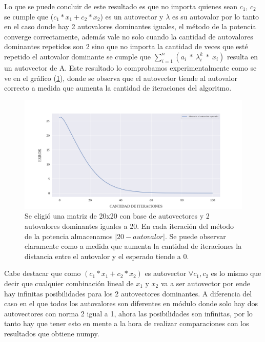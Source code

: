 Lo que se puede concluir de este resultado es que no importa quienes sean $c_1$, $c_2$ se cumple que ($c_1 * x_1 + c_2 * x_2$) es un autovector y $\lambda$ es su autovalor por lo tanto en el caso donde hay 2 autovalores dominantes iguales, el método de la potencia converge correctamente, además vale no solo cuando la cantidad de autovalores dominantes repetidos son 2 sino que no importa la cantidad de veces que esté repetido el autovalor dominante se cumple que $\sum_{i=1}^{n} (a_i \ * \ \lambda_{i}^{k} \ * \ x_i)$ resulta en un autovector de A.
Este resultado lo comprobamos experimentalmente como se ve en el gráfico (\ref{fig:autovalor_repetido}), donde se observa que el autovector tiende al autovalor correcto a medida que aumenta la cantidad de iteraciones del algoritmo.


\vspace{1em}
\begin{figure}[!htbp]
    \includegraphics[scale=0.45]{files/src/.media/op_autovalor_repetido.png}
    \caption{Se eligió una matriz de 20x20 con base de autovectores y 2 autovalores dominantes iguales a 20. En cada iteración del método de la potencia almacenamos $|20 - autovalor|$. Se puede observar claramente como a medida que aumenta la cantidad de iteraciones la distancia entre el autovalor y el esperado tiende a 0.}
    \label{fig:autovalor_repetido}
\end{figure}

Cabe destacar que como $(c_1 * x_1 + c_2 * x_2)$ es autovector $\forall c_1, c_2$ es lo mismo que decir que cualquier combinación lineal de $x_1$ y $x_2$ va a ser autovector por ende hay infinitas posibilidades para los 2 autovectores dominantes. A diferencia del caso en el que todos los autovalores son diferentes en módulo donde solo hay dos autovectores con norma 2 igual a 1, ahora las posibilidades son infinitas, por lo tanto hay que tener esto en mente a la hora de realizar comparaciones con los resultados que obtiene numpy. 

